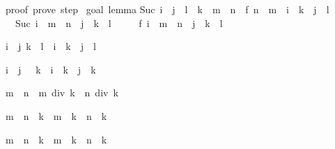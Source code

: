 \begin{isabellebody}
\begin{isamarkuptext}
proof\ {\isacharparenleft}prove{\isacharparenright}{\isacharcolon}\ step\ {}\isanewline
\isanewline
goal\ {\isacharparenleft}lemma{\isacharparenright}{\isacharcolon}\isanewline
Suc\ {\isacharparenleft}i\ {\isacharplus}\ j\ {\isacharasterisk}\ l\ {\isacharasterisk}\ k\ {\isacharplus}\ m\ {\isacharasterisk}\ n{\isacharparenright}\ {\isacharequal}\ f\ {\isacharparenleft}n\ {\isacharasterisk}\ m\ {\isacharplus}\ i\ {\isacharplus}\ k\ {\isacharasterisk}\ j\ {\isacharasterisk}\ l{\isacharparenright}\isanewline
\ {}{\isachardot}\ Suc\ {\isacharparenleft}i\ {\isacharplus}\ {\isacharparenleft}m\ {\isacharasterisk}\ n\ {\isacharplus}\ j\ {\isacharasterisk}\ {\isacharparenleft}k\ {\isacharasterisk}\ l{\isacharparenright}{\isacharparenright}{\isacharparenright}\ {\isacharequal}\isanewline
\ \ \ \ f\ {\isacharparenleft}i\ {\isacharplus}\ {\isacharparenleft}m\ {\isacharasterisk}\ n\ {\isacharplus}\ j\ {\isacharasterisk}\ {\isacharparenleft}k\ {\isacharasterisk}\ l{\isacharparenright}{\isacharparenright}{\isacharparenright}%
\end{isamarkuptext}%
%
\begin{isamarkuptext}%
\begin{isabelle}%
{\isasymlbrakk}i\ {\isasymle}\ j{\isacharsemicolon}\ k\ {\isasymle}\ l{\isasymrbrakk}\ {\isasymLongrightarrow}\ i\ {\isacharasterisk}\ k\ {\isasymle}\ j\ {\isacharasterisk}\ l%
\end{isabelle}

\begin{isabelle}%
{\isasymlbrakk}i\ {\isacharless}\ j{\isacharsemicolon}\ {}\ {\isacharless}\ k{\isasymrbrakk}\ {\isasymLongrightarrow}\ i\ {\isacharasterisk}\ k\ {\isacharless}\ j\ {\isacharasterisk}\ k%
\end{isabelle}

\begin{isabelle}%
m\ {\isasymle}\ n\ {\isasymLongrightarrow}\ m\ div\ k\ {\isasymle}\ n\ div\ k%
\end{isabelle}

\begin{isabelle}%
{\isacharparenleft}m\ {\isacharplus}\ n{\isacharparenright}\ {\isacharasterisk}\ k\ {\isacharequal}\ m\ {\isacharasterisk}\ k\ {\isacharplus}\ n\ {\isacharasterisk}\ k%
\end{isabelle}

\begin{isabelle}%
{\isacharparenleft}m\ {\isacharminus}\ n{\isacharparenright}\ {\isacharasterisk}\ k\ {\isacharequal}\ m\ {\isacharasterisk}\ k\ {\isacharminus}\ n\ {\isacharasterisk}\ k%
\end{isabelle}


\end{isamarkuptext}
\end{isabellebody}
